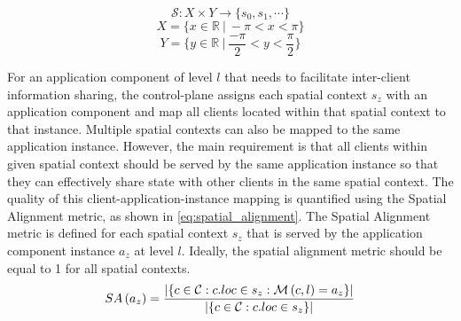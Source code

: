 \begin{equation}
\label{eq:spatial_context}
   \mathcal{S}: X \times Y \rightarrow \{ s_0, s_1, \cdots \}
\end{equation}
\begin{equation}
   X = \{x \in \mathbb{R}~|~-\pi < x < \pi\}
\end{equation}
\begin{equation}
   Y = \{y \in \mathbb{R}~|~\dfrac{-\pi}{2} < y < \dfrac{\pi}{2}\}
\end{equation}

For an application component of level $l$ that needs to facilitate inter-client information sharing, the control-plane assigns each spatial context $s_z$ with an application component and map all clients located within that spatial context to that instance. Multiple spatial contexts can also be mapped to the same application instance. However, the main requirement is that all clients within given spatial context should be served by the same application instance so that they can effectively share state with other clients in the same spatial context. The quality of this client-application-instance mapping is quantified using the Spatial Alignment metric, as shown in \cref{eq:spatial_alignment}. The Spatial Alignment metric is defined for each spatial context $s_z$ that is served by the application component instance $a_z$ at level $l$.  Ideally, the spatial alignment metric should be equal to 1 for all spatial contexts.
\begin{equation}
\label{eq:spatial_alignment}
SA \left( a_z \right) = \dfrac{|\{ c \in \mathcal{C} : c.loc \in s_z  : \mathcal{M} \left( c, l\right) = a_z \}|}{|\{ c \in \mathcal{C} : c.loc \in s_z \}|}
\end{equation}

